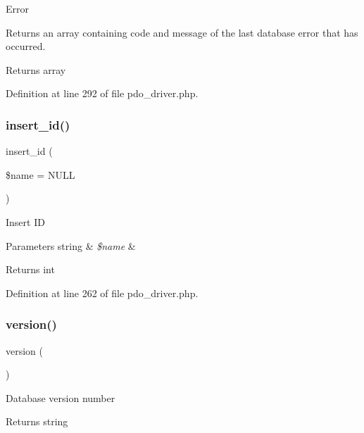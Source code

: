 Error

Returns an array containing code and message of the last database error that has occurred.

\begin{DoxyReturn}{Returns}
array 
\end{DoxyReturn}


Definition at line 292 of file pdo\+\_\+driver.\+php.

\mbox{\label{class_c_i___d_b__pdo__driver_ae61dc2c85e5516f143f6246c686bc3fc}} 
\subsubsection{\texorpdfstring{insert\_id()}{insert\_id()}}
{\footnotesize\ttfamily insert\+\_\+id (\begin{DoxyParamCaption}\item[{}]{\$name = {\ttfamily NULL} }\end{DoxyParamCaption})}

Insert ID


\begin{DoxyParams}[1]{Parameters}
string & {\em \$name} & \\
\hline
\end{DoxyParams}
\begin{DoxyReturn}{Returns}
int 
\end{DoxyReturn}


Definition at line 262 of file pdo\+\_\+driver.\+php.

\mbox{\label{class_c_i___d_b__pdo__driver_a6080dae0886626b9a4cedb29240708b1}} 
\subsubsection{\texorpdfstring{version()}{version()}}
{\footnotesize\ttfamily version (\begin{DoxyParamCaption}{ }\end{DoxyParamCaption})}

Database version number

\begin{DoxyReturn}{Returns}
string 
\end{DoxyReturn}


